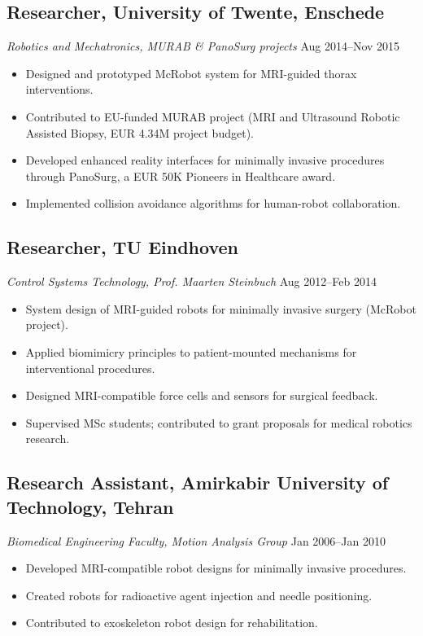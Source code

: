 \documentclass[11pt,a4paper]{article}
\begin{document}
\subsection{Researcher, University of Twente, Enschede}
{\small\textit{Robotics and Mechatronics, MURAB \& PanoSurg projects}} \hfill {\small Aug 2014--Nov 2015}
\begin{itemize}
 \item Designed and prototyped McRobot system for MRI-guided thorax interventions.
 \item Contributed to EU-funded MURAB project (MRI and Ultrasound Robotic Assisted Biopsy, EUR 4.34M project budget).
 \item Developed enhanced reality interfaces for minimally invasive procedures through PanoSurg, a EUR 50K Pioneers in Healthcare award.
 \item Implemented collision avoidance algorithms for human-robot collaboration.
\end{itemize}

\subsection{Researcher, TU Eindhoven}
{\small\textit{Control Systems Technology, Prof. Maarten Steinbuch}} \hfill {\small Aug 2012--Feb 2014}
\begin{itemize}
 \item System design of MRI-guided robots for minimally invasive surgery (McRobot project).
 \item Applied biomimicry principles to patient-mounted mechanisms for interventional procedures.
 \item Designed MRI-compatible force cells and sensors for surgical feedback.
 \item Supervised MSc students; contributed to grant proposals for medical robotics research.
\end{itemize}

\subsection{Research Assistant, Amirkabir University of Technology, Tehran}
{\small\textit{Biomedical Engineering Faculty, Motion Analysis Group}} \hfill {\small Jan 2006--Jan 2010}
\begin{itemize}
 \item Developed MRI-compatible robot designs for minimally invasive procedures.
 \item Created robots for radioactive agent injection and needle positioning.
 \item Contributed to exoskeleton robot design for rehabilitation.
\end{itemize}
\end{document}
